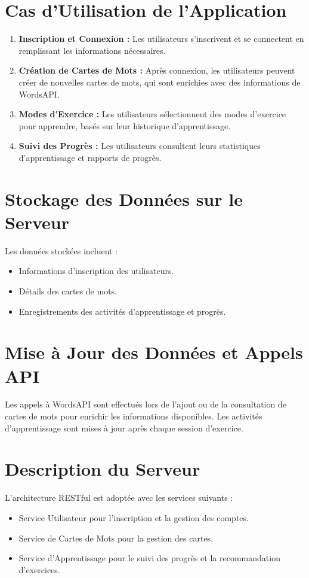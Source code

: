 \documentclass{article}
\begin{document}
	\section{Cas d'Utilisation de l'Application}
	\begin{enumerate}
		\item \textbf{Inscription et Connexion :} Les utilisateurs s'inscrivent et se connectent en remplissant les informations nécessaires.
		\item \textbf{Création de Cartes de Mots :} Après connexion, les utilisateurs peuvent créer de nouvelles cartes de mots, qui sont enrichies avec des informations de WordsAPI.
		\item \textbf{Modes d'Exercice :} Les utilisateurs sélectionnent des modes d'exercice pour apprendre, basés sur leur historique d'apprentissage.
		\item \textbf{Suivi des Progrès :} Les utilisateurs consultent leurs statistiques d'apprentissage et rapports de progrès.
	\end{enumerate}
	
	\section{Stockage des Données sur le Serveur}
	Les données stockées incluent :
	\begin{itemize}
		\item Informations d'inscription des utilisateurs.
		\item Détails des cartes de mots.
		\item Enregistrements des activités d'apprentissage et progrès.
	\end{itemize}
	
	\section{Mise à Jour des Données et Appels API}
	Les appels à WordsAPI sont effectués lors de l'ajout ou de la consultation de cartes de mots pour enrichir les informations disponibles. Les activités d'apprentissage sont mises à jour après chaque session d'exercice.
	
	\section{Description du Serveur}
	L'architecture RESTful est adoptée avec les services suivants :
	\begin{itemize}
		\item Service Utilisateur pour l'inscription et la gestion des comptes.
		\item Service de Cartes de Mots pour la gestion des cartes.
		\item Service d'Apprentissage pour le suivi des progrès et la recommandation d'exercices.
	\end{itemize}
	
\end{document}
